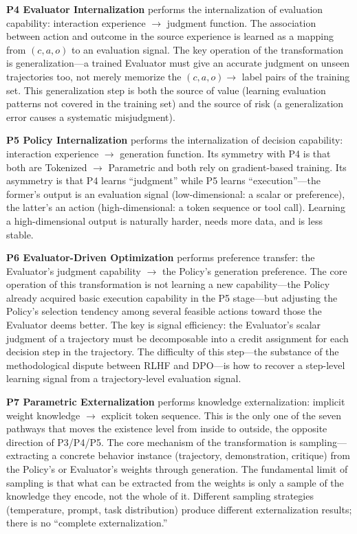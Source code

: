 \textbf{P4 Evaluator Internalization} performs the internalization of evaluation capability: interaction experience $\rightarrow$ judgment function. The association between action and outcome in the source experience is learned as a mapping from $(c,a,o)$ to an evaluation signal. The key operation of the transformation is generalization---a trained Evaluator must give an accurate judgment on unseen trajectories too, not merely memorize the $(c,a,o) \rightarrow$ label pairs of the training set. This generalization step is both the source of value (learning evaluation patterns not covered in the training set) and the source of risk (a generalization error causes a systematic misjudgment).

\textbf{P5 Policy Internalization} performs the internalization of decision capability: interaction experience $\rightarrow$ generation function. Its symmetry with P4 is that both are Tokenized $\rightarrow$ Parametric and both rely on gradient-based training. Its asymmetry is that P4 learns ``judgment'' while P5 learns ``execution''---the former's output is an evaluation signal (low-dimensional: a scalar or preference), the latter's an action (high-dimensional: a token sequence or tool call). Learning a high-dimensional output is naturally harder, needs more data, and is less stable.

\textbf{P6 Evaluator-Driven Optimization} performs preference transfer: the Evaluator's judgment capability $\rightarrow$ the Policy's generation preference. The core operation of this transformation is not learning a new capability---the Policy already acquired basic execution capability in the P5 stage---but adjusting the Policy's selection tendency among several feasible actions toward those the Evaluator deems better. The key is signal efficiency: the Evaluator's scalar judgment of a trajectory must be decomposable into a credit assignment for each decision step in the trajectory. The difficulty of this step---the substance of the methodological dispute between RLHF and DPO---is how to recover a step-level learning signal from a trajectory-level evaluation signal.

\textbf{P7 Parametric Externalization} performs knowledge externalization: implicit weight knowledge $\rightarrow$ explicit token sequence. This is the only one of the seven pathways that moves the existence level from inside to outside, the opposite direction of P3/P4/P5. The core mechanism of the transformation is sampling---extracting a concrete behavior instance (trajectory, demonstration, critique) from the Policy's or Evaluator's weights through generation. The fundamental limit of sampling is that what can be extracted from the weights is only a sample of the knowledge they encode, not the whole of it. Different sampling strategies (temperature, prompt, task distribution) produce different externalization results; there is no ``complete externalization.''

